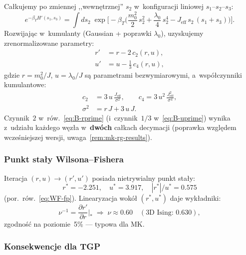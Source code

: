 Ca\l{}kujemy po zmiennej ,,wewn\k{e}trznej'' $s_2$
w~konfiguracji liniowej $s_1$--$s_2$--$s_3$:
\begin{equation}\label{eq:B-decimation}
  e^{-\beta_T H'(s_1,s_3)}
  = \int ds_2\;\exp\!\biggl[-\beta_T\!\biggl(
    \frac{m_0^2}{2}\,s_2^2 + \frac{\lambda_0}{4}\,s_2^4
    - J_{\mathrm{eff}}\,s_2\,(s_1+s_3)
  \biggr)\biggr].
\end{equation}
Rozwijaj\k{a}c w~kumulanty (Gaussian + poprawki $\lambda_0$),
uzyskujemy zrenormalizowane parametry:
\begin{align}
  r' &= r - 2\,c_2(r, u), \label{eq:B-rprime}\\
  u' &= u - \tfrac{1}{3}\,c_4(r, u), \label{eq:B-uprime}
\end{align}
gdzie $r = m_0^2/J$, $u = \lambda_0/J$ s\k{a} parametrami
bezwymiarowymi, a~wsp\'o\l{}czynniki kumulantowe:
\begin{align}
  c_2 &= 3\,u\,\frac{J_{\mathrm{eff}}}{\sigma^2}, \qquad
  c_4 = 3\,u^2\,\frac{J_{\mathrm{eff}}^2}{\sigma^4}, \\
  \sigma^2 &= r\,J + 3\,u\,J.
\end{align}
Czynnik~$2$ w~r\'ow.~\eqref{eq:B-rprime}
(i~czynnik~$1/3$ w~\eqref{eq:B-uprime})
wynika z~udzia\l{}u ka\.zdego w\k{e}z\l{}a w~\textbf{dw\'och}
ca\l{}kach decymacji (poprawka wzgl\k{e}dem wcze\'sniejszej
wersji, uwaga~\ref{rem:mk-rg-results}).

\subsubsection{Punkt sta\l{}y Wilsona--Fishera}

Iteracja $(r, u) \to (r', u')$ posiada nietrywialny punkt
sta\l{}y:
\begin{equation}\label{eq:B-WF}
  \boxed{
    r^* = -2.251, \quad u^* = 3.917, \quad
    |r^*|/u^* = 0.575
  }
\end{equation}
(por.\ r\'ow.~\ref{eq:WF-fp}).
Linearyzacja wok\'o\l{} $(r^*, u^*)$ daje wyk\l{}adniki:
\begin{equation}\label{eq:B-exponents}
  \nu^{-1} = \frac{\partial r'}{\partial r}\biggr|_{*}
  \;\Rightarrow\; \nu \approx 0.60
  \quad (\text{3D Ising: } 0.630),
\end{equation}
zgodno\'s\'c na poziomie~5\% --- typowa dla MK.

\subsubsection{Konsekwencje dla TGP}


